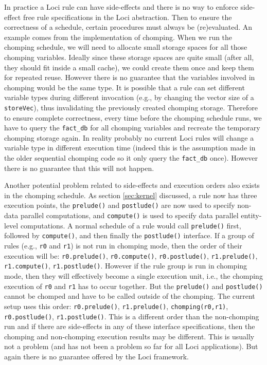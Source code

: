 \documentclass{article}
\begin{document}
In practice a Loci rule can have side-effects and there is no way to
enforce side-effect free rule specifications in the Loci abstraction.
Then to ensure the correctness of a schedule, certain procedures must
always be (re)evaluated.  An example comes from the implementation of
chomping.  When we run the chomping schedule, we will need to allocate
small storage spaces for all those chomping variables.  Ideally since
these storage spaces are quite small (after all, they should fit inside
a small cache), we could create them once and keep them for repeated
reuse.  However there is no guarantee that the variables involved in
chomping would be the same type.  It is possible that a rule can set
different variable types during different invocation (e.g., by
changing the vector size of a \lstinline{storeVec}), thus invalidating
the previously created chomping storage.  Therefore to ensure complete
correctness, every time before the chomping schedule runs, we have to
query the \lstinline{fact_db} for all chomping variables and recreate
the temporary chomping storage again.  In reality probably no current
Loci rules will change a variable type in different execution time
(indeed this is the assumption made in the older sequential chomping
code so it only query the \lstinline{fact_db} once).  However there is
no guarantee that this will not happen.

Another potential problem related to side-effects and execution orders
also exists in the chomping schedule.  As section \ref{sec:kernel}
discussed, a rule now has three execution points, the
\lstinline{prelude()} and \lstinline{postlude()} are now used to specify
non-data parallel computations, and \lstinline{compute()} is used to
specify data parallel entity-level computations.  A normal schedule
of a rule would call \lstinline{prelude()} first, followed by
\lstinline{compute()}, and then finally the \lstinline{postlude()}
interface.  If a group of rules (e.g., \lstinline{r0} and
\lstinline{r1}) is not run in chomping mode, then the order of their
execution will be: \lstinline{r0.prelude()},
\lstinline{r0.compute()}, \lstinline{r0.postlude()},
\lstinline{r1.prelude()}, \lstinline{r1.compute()},
\lstinline{r1.postlude()}.  However if the rule group is run in chomping
mode, then they will effectively become a single execution unit, i.e.,
the chomping execution of \lstinline{r0} and \lstinline{r1} has to occur
together.  But the \lstinline{prelude()} and \lstinline{postlude()}
cannot be chomped and have to be called outside of the chomping.  The
current setup uses this order: \lstinline{r0.prelude()},
\lstinline{r1.prelude()}, \lstinline{chomping(r0,r1)},
\lstinline{r0.postlude()}, \lstinline{r1.postlude()}.  This is a
different order than the non-chomping run and if there are side-effects
in any of these interface specifications, then the chomping and
non-chomping execution results may be different.  This is usually not a
problem (and has not been a problem so far for all Loci applications).
But again there is no guarantee offered by the Loci framework.
\end{document}
